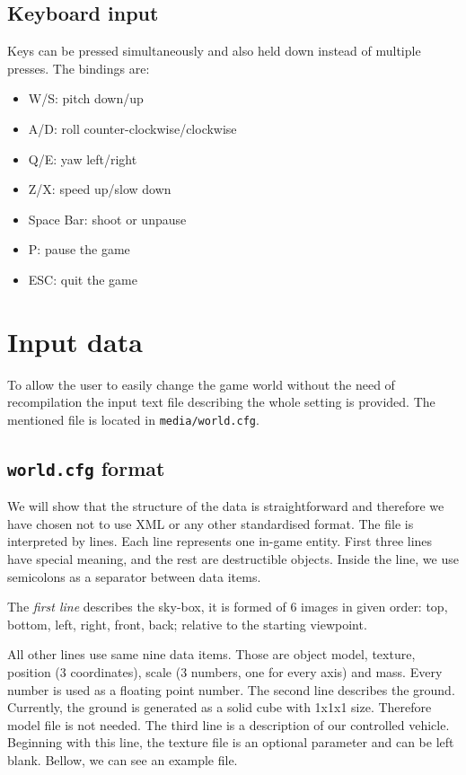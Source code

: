 \subsection*{Keyboard input}
Keys can be pressed simultaneously and also held down instead of multiple presses. The bindings are:
\begin{itemize}
\item W/S: pitch down/up
\item A/D: roll counter-clockwise/clockwise 
\item Q/E: yaw left/right
\item Z/X: speed up/slow down
\item Space Bar: shoot or unpause
\item P: pause the game
\item ESC: quit the game
\end{itemize}


\section{Input data}
\label{sec:data}
To allow the user to easily change the game world without the need of recompilation the input text file describing the whole setting is provided. The mentioned file is located in {\tt media/world.cfg}. 

\subsection*{{\tt world.cfg} format}
We will show that the structure of the data is straightforward and therefore we have chosen not to use XML or any other standardised format. The file is interpreted by lines. Each line represents one in-game entity. First three lines have special meaning, and the rest are destructible objects. Inside the line, we use semicolons as a separator between data items.

The \emph{first line} describes the sky-box, it is formed of 6 images in given order: top, bottom, left, right, front, back; relative to the starting viewpoint. 

All other lines use same nine data items. Those are object model, texture, position (3 coordinates), scale (3 numbers, one for every axis) and mass. Every number is used as a floating point number.
The second line describes the ground. Currently, the ground is generated as a solid cube with 1x1x1 size. Therefore model file is not needed. The third line is a description of our controlled vehicle. Beginning with this line, the texture file is an optional parameter and can be left blank. Bellow, we can see an example file.

